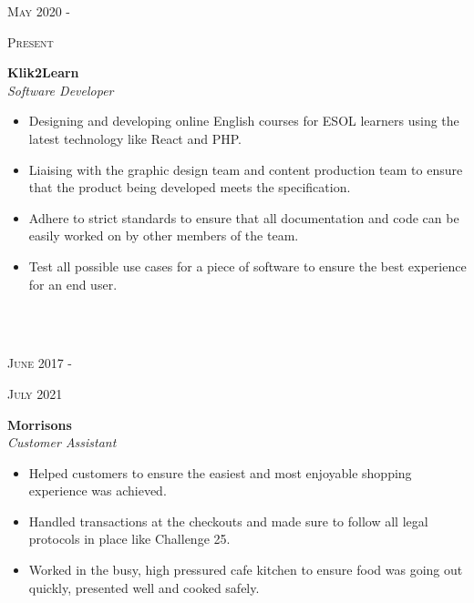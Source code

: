 \documentclass[11pt, english]{article}
\begin{document}
		\begin{minipage}[t]{.15\linewidth}
			\hfill                    
		\textsc{May 2020 - }
		
		\hfill
		\textsc{Present}
		\end{minipage}                    
		\hfill\vline\hfill                
		\begin{minipage}[t]{.80\linewidth}                    
		 \textbf{Klik2Learn }\\
		\textit{Software Developer}\\ 
		
		\begin{itemize}[noitemsep,nolistsep]
			\item Designing and developing online English courses for ESOL learners using the latest technology like React and PHP. 
			\item Liaising with the graphic design team and content production team to ensure that the product being developed meets the specification.
			\item Adhere to strict standards to ensure that all documentation and code can be easily worked on by other members of the team.
			\item Test all possible use cases for a piece of software to ensure the best experience for an end user.
		\end{itemize}
		
		\end{minipage}\\ \\
		
		\begin{minipage}[t]{.15\linewidth}
			\hfill                    
			\textsc{June 2017 - }

			\hfill
			\textsc{July 2021}
		\end{minipage}                                        
		\hfill\vline\hfill                                   
		\begin{minipage}[t]{.80\linewidth}                    
	\textbf{Morrisons }\\
	\textit{Customer Assistant}\\ 
		
	\begin{itemize}[noitemsep,nolistsep]
	\item 	Helped customers to ensure the easiest and most enjoyable shopping experience was achieved. 
	\item  Handled transactions at the checkouts and made sure to follow all legal protocols in place like Challenge 25. 
	\item Worked in the busy, high pressured cafe kitchen to ensure food was going out quickly, presented well and cooked safely. 
\end{itemize}
\end{minipage}\\    
\end{document}
